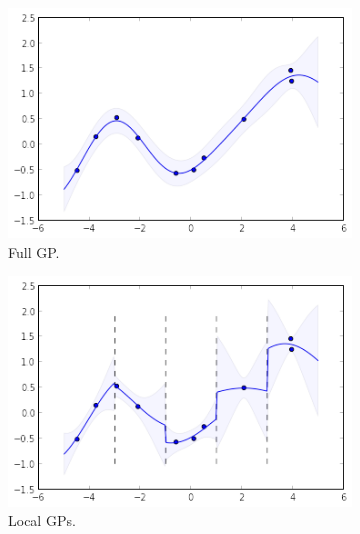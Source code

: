 \documentclass{article}
\begin{document}
\begin{figure}
\centering

\begin{subfigure}[t]{.30\textwidth}
                \includegraphics[width=\textwidth]{toy_gp_posterior}
                \caption{Full GP. }
                \label{fig:gp}
        \end{subfigure}\hspace{0.5em}
\begin{subfigure}[t]{.30\textwidth}
  \includegraphics[width=\textwidth]{toy_lgp_posterior}
  \caption{Local GPs.}
  \label{fig:local}
\end{subfigure}\hspace{0.5em}
\begin{subfigure}[t]{.30\textwidth}

\end{subfigure}
\end{figure}
\end{document}
